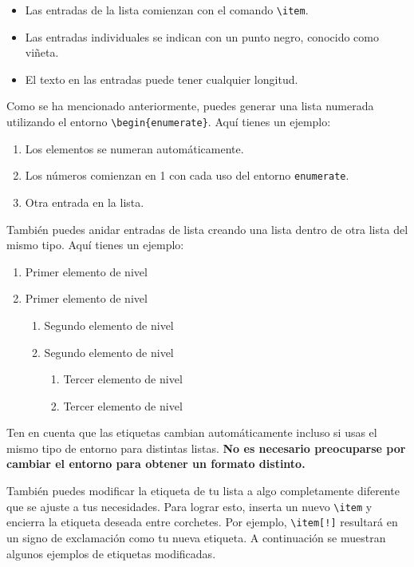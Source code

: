 \begin{itemize}
  \item Las entradas de la lista comienzan con el comando \verb|\item|.
  \item Las entradas individuales se indican con un punto negro, conocido como viñeta.
  \item El texto en las entradas puede tener cualquier longitud.
\end{itemize}

Como se ha mencionado anteriormente, puedes generar una lista numerada utilizando el entorno \verb|\begin{enumerate}|. Aquí tienes un ejemplo:

\begin{enumerate}
  \item Los elementos se numeran automáticamente.
  \item Los números comienzan en 1 con cada uso del entorno \verb|enumerate|.
  \item Otra entrada en la lista.
\end{enumerate}

También puedes anidar entradas de lista creando una lista dentro de otra lista del mismo tipo. Aquí tienes un ejemplo:

\begin{enumerate}
    \item Primer elemento de nivel
    \item Primer elemento de nivel
    \begin{enumerate}
        \item Segundo elemento de nivel
        \item Segundo elemento de nivel
    \begin{enumerate}
        \item Tercer elemento de nivel
        \item Tercer elemento de nivel
    \end{enumerate}
    \end{enumerate}
\end{enumerate}

\begin{consejo}
Ten en cuenta que las etiquetas cambian automáticamente incluso si usas el mismo tipo de entorno para distintas listas. \textbf{No es necesario preocuparse por cambiar el entorno para obtener un formato distinto.}
\end{consejo}

También puedes modificar la etiqueta de tu lista a algo completamente diferente que se ajuste a tus necesidades. Para lograr esto, inserta un nuevo \verb|\item| y encierra la etiqueta deseada entre corchetes. Por ejemplo, \verb|\item[!]| resultará en un signo de exclamación como tu nueva etiqueta. A continuación se muestran algunos ejemplos de etiquetas modificadas.


